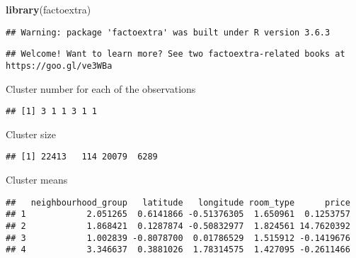 \documentclass[
]{article}
\newenvironment{Shaded}{\begin{snugshade}}{\end{snugshade}}
\newcommand{\KeywordTok}[1]{\textcolor[rgb]{0.13,0.29,0.53}{\textbf{#1}}}
\newcommand{\NormalTok}[1]{#1}
\newcommand{\OperatorTok}[1]{\textcolor[rgb]{0.81,0.36,0.00}{\textbf{#1}}}
\begin{document}
\begin{Shaded}
\begin{Highlighting}[]
\KeywordTok{library}\NormalTok{(factoextra)}
\end{Highlighting}
\end{Shaded}

\begin{verbatim}
## Warning: package 'factoextra' was built under R version 3.6.3
\end{verbatim}

\begin{verbatim}
## Welcome! Want to learn more? See two factoextra-related books at https://goo.gl/ve3WBa
\end{verbatim}

Cluster number for each of the observations

\begin{Shaded}
\end{Shaded}

\begin{verbatim}
## [1] 3 1 1 3 1 1
\end{verbatim}

Cluster size

\begin{Shaded}
\end{Shaded}

\begin{verbatim}
## [1] 22413   114 20079  6289
\end{verbatim}

Cluster means

\begin{Shaded}
\end{Shaded}

\begin{verbatim}
##   neighbourhood_group   latitude   longitude room_type      price
## 1            2.051265  0.6141866 -0.51376305  1.650961  0.1253757
## 2            1.868421  0.1287874 -0.50832977  1.824561 14.7620392
## 3            1.002839 -0.8078700  0.01786529  1.515912 -0.1419676
## 4            3.346637  0.3881026  1.78314575  1.427095 -0.2611466
\end{verbatim}
\end{document}
